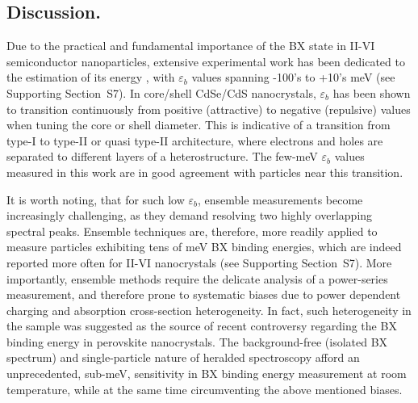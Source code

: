 \documentclass[journal=nalefd, manuscript=letter, layout=twocolumn]{achemso}
\newcommand{\supp}[1]{Supporting Section~S#1}
\begin{document}
\subsection*{Discussion.}\label{sec:discussion}
Due to the practical and fundamental importance of the BX state in II-VI semiconductor nanoparticles, extensive experimental work has been dedicated to the estimation of its energy \cite{Achermann2003,Oron2006,Oron2007,Klimov2007,Sitt2009,Sewall2009,Sewall2011,Geiregat2019,Mueller2021}, with $\varepsilon_b$ values spanning -100's to +10's meV (see \supp{7}). In core/shell CdSe/CdS nanocrystals, $\varepsilon_b$ has been shown to transition continuously from positive (attractive) to negative (repulsive) values when tuning the core or shell diameter\cite{Sitt2009}. This is indicative of a transition from type-I to type-II or quasi type-II architecture, where electrons and holes are separated to different layers of a heterostructure\cite{Oron2007}. The few-meV $\varepsilon_b$ values measured in this work are in good agreement with particles near this transition.

It is worth noting, that for such low $\varepsilon_b$, ensemble measurements become increasingly challenging, as they demand resolving two highly overlapping spectral peaks. Ensemble techniques are, therefore, more readily applied to measure particles exhibiting tens of meV BX binding energies, which are indeed reported more often for II-VI nanocrystals (see \supp{7}). More importantly, ensemble methods require the delicate analysis of a power-series measurement, and therefore prone to systematic biases due to power dependent charging and absorption cross-section heterogeneity. In fact, such heterogeneity in the sample was suggested as the source of recent controversy regarding the BX binding energy in perovskite nanocrystals\cite{Castaneda2016,Shulenberger2019}. The background-free (isolated BX spectrum) and single-particle nature of heralded spectroscopy afford an unprecedented, sub-meV, sensitivity in BX binding energy measurement at room temperature, while at the same time circumventing the above mentioned biases. 
\end{document}
